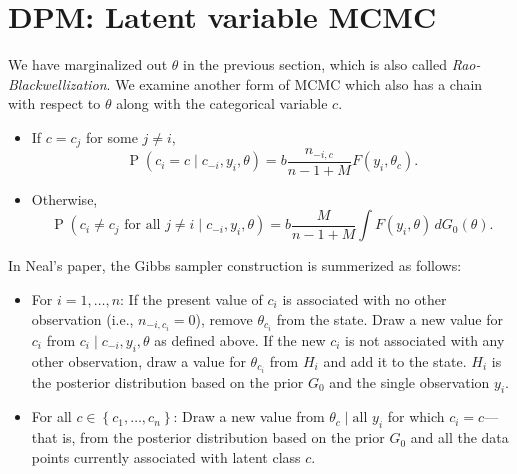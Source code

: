 \documentclass[11pt]{article}
\newcommand{\opn}{\operatorname}
\begin{document}
\section{DPM: Latent variable MCMC}
We have marginalized out $\theta$ in the previous section, which is also called \emph{Rao-Blackwellization}. We examine another form of MCMC which also has a chain with respect to $\theta$ along with the categorical variable $c$.
\begin{itemize}
  \item If $c = c_{j}$ for some $j \neq i$,
    \begin{equation}
      \opn{P}\left(c_{i}=c\;|\; c_{-i}, y_{i}, \theta\right) = b\frac{n_{-i,c}}{n-1+M}F\left(y_{i}, \theta_{c}\right).
    \end{equation}
  \item Otherwise,
    \begin{equation}
      \opn{P}\left(c_{i}\neq c_{j}\text{ for all }j \neq i\;|\; c_{-i}, y_{i}, \theta\right) = b\frac{M}{n-1+M}\int F\left(y_{i},\theta\right)\,dG_{0}\left(\theta\right).
    \end{equation}
\end{itemize}
In Neal's paper, the Gibbs sampler construction is summerized as follows:
\begin{itemize}
  \item For $i=1,\ldots , n$: If the present value of $c_{i}$ is associated with no other observation (i.e., $n_{-i,c_{i}}=0$), remove $\theta_{c_{i}}$ from the state. Draw a new value for $c_{i}$ from $c_{i}\;|\; c_{-i}, y_{i}, \theta$ as defined above. If the new $c_{i}$ is not associated with any other observation, draw a value for $\theta_{c_{i}}$ from $H_{i}$ and add it to the state. $H_{i}$ is the posterior distribution based on the prior $G_{0}$ and the single observation $y_{i}$.
  \item For all $c \in \left\{c_{1},\ldots , c_{n}\right\}$: Draw a new value from $\theta_{c}\;|\;\text{all $y_{i}$}$ for which $c_{i}=c$--- that is, from the posterior distribution based on the prior $G_{0}$ and all the data points currently associated with latent class $c$.
\end{itemize}
\end{document}
